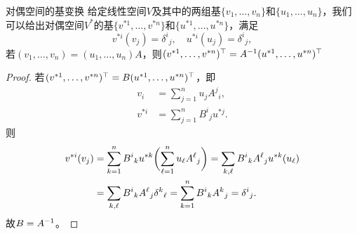 \begin{theorem}{对偶空间的基变换}{}
	给定线性空间$V$及其中的两组基$\{v_1,\ldots,v_n\}$和$\{u_1,\ldots,u_n\}$，我们可以给出对偶空间$V^\ast$的基$\{v^{\ast 1},\ldots,v^{\ast n}\}$和$\{u^{\ast 1},\ldots,u^{\ast n}\}$，满足
	\[
		v^{\ast i}(v_j) = \delta^i{}_j,\quad u^{\ast i}(u_j) = \delta^i{}_j,
	\]
	若$(v_1,\ldots,v_n) = (u_1,\ldots,u_n)A$，则$(v^{\ast 1},\ldots,v^{\ast n})^\top = A^{-1}(u^{\ast 1},\ldots,u^{\ast n})^\top$
\end{theorem}
\begin{proof}
	若$(v^{\ast 1},\ldots,v^{\ast n})^\top = B(u^{\ast 1},\ldots,u^{\ast n})^\top$，即
	\begin{align*}
		v_i &= \sum_{j=1}^nu_jA^j{}_i,\\
		v^{\ast i} &= \sum_{j=1}^nB^i{}_ju^{\ast j}.
	\end{align*}
	则
	\begin{align*}
		v^{\ast i}(v_j) &= \sum_{k=1}^nB^i{}_ku^{\ast k}\biggl(\sum_{\ell=1}^n u_\ell A^\ell{}_j\biggr) = \sum_{k,\ell}B^i{}_kA^\ell{}_ju^{\ast k}(u_\ell)\\
		&= \sum_{k,\ell}B^i{}_kA^\ell{}_j\delta^k{}_\ell = \sum_{k=1}^nB^i{}_kA^k{}_j = \delta^i{}_j.
	\end{align*}
	故$B = A^{-1}$。
\end{proof}
